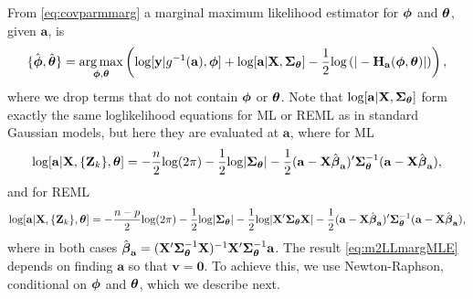 \documentclass[12pt, titlepage]{article}
\begin{document}
From \eqref{eq:covparmmarg} a marginal maximum likelihood estimator for $\boldsymbol{\phi}$ and $\boldsymbol{\theta}$, given $\mathbf{a}$, is
\begin{equation} \label{eq:m2LLmargMLE}
\{\hat{\boldsymbol{\phi}}, \hat{\boldsymbol{\theta}} \} = \underset{\boldsymbol{\phi},\boldsymbol{\theta}}{\arg\max} \left( \textrm{log}[\mathbf{y}|g^{-1}(\mathbf{a}),\boldsymbol{\phi}] +
	\textrm{log}[\mathbf{a}|\mathbf{X},\mbox{\boldmath $\Sigma$}_{\boldsymbol{\theta}}] - \frac{1}{2}\textrm{log} \left(|-\mathbf{H}_\mathbf{a}(\boldsymbol{\phi},\boldsymbol{\theta})|\right) \right),
\end{equation}
where we drop terms that do not contain $\boldsymbol{\phi}$ or $\boldsymbol{\theta}$.  Note that $\textrm{log}[\mathbf{a}|\mathbf{X},\mbox{\boldmath $\Sigma$}_{\boldsymbol{\theta}}]$ form exactly the same loglikelihood equations for ML or REML as in standard Gaussian models, but here they are evaluated at $\mathbf{a}$, where for ML
$$
\textrm{log}[\mathbf{a}|\mathbf{X},\{\mathbf{Z}_{k}\},\boldsymbol{\theta}] = -\frac{n}{2}\textrm{log}(2\pi) - \frac{1}{2}\textrm{log}|\mbox{\boldmath $\Sigma$}_{\boldsymbol{\theta}}| - \frac{1}{2}(\mathbf{a} - \mathbf{X}\hat{\boldsymbol{\beta}}_{\mathbf{a}})^{\prime}\mbox{\boldmath $\Sigma$}_{\boldsymbol{\theta}}^{-1}(\mathbf{a} - \mathbf{X}\hat{\boldsymbol{\beta}}_{\mathbf{a}}),
$$
and for REML
$$
\textrm{log}[\mathbf{a}|\mathbf{X},\{\mathbf{Z}_{k}\},\boldsymbol{\theta}] = -\frac{n-p}{2}\textrm{log}(2\pi) - \frac{1}{2}\textrm{log}|\mbox{\boldmath $\Sigma$}_{\boldsymbol{\theta}}| - \frac{1}{2}\textrm{log}|\mathbf{X}^{\prime}\mbox{\boldmath $\Sigma$}_{\boldsymbol{\theta}}\mathbf{X}| - \frac{1}{2}(\mathbf{a} - \mathbf{X}\hat{\boldsymbol{\beta}}_{\mathbf{a}})^{\prime}\mbox{\boldmath $\Sigma$}_{\boldsymbol{\theta}}^{-1}(\mathbf{a} - \mathbf{X}\hat{\boldsymbol{\beta}}_{\mathbf{a}}),
$$
where in both cases $\hat{\boldsymbol{\beta}}_{\mathbf{a}} = (\mathbf{X}^{\prime}\mbox{\boldmath $\Sigma$}_{\boldsymbol{\theta}}^{-1}\mathbf{X})^{-1}\mathbf{X}^{\prime}\mbox{\boldmath $\Sigma$}_{\boldsymbol{\theta}}^{-1}\mathbf{a}$. The result \eqref{eq:m2LLmargMLE} depends on finding $\mathbf{a}$ so that $\mathbf{v} = \mathbf{0}$.  To achieve this, we use Newton-Raphson, conditional on $\boldsymbol{\phi}$ and $\boldsymbol{\theta}$, which we describe next.
\end{document}

